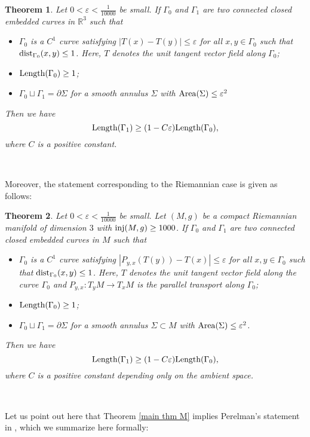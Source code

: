 \documentclass[a4paper, reqno]{amsart}
\newtheorem{theorem}{Theorem}[section]
\theoremstyle{definition}
\theoremstyle{remark}
\numberwithin{equation}{section}
\newcommand{\dist}{\textup{dist}}
\newcommand{\Len}{\textup{Length}}
\newcommand{\inj}{\textup{inj}}
\numberwithin{equation}{section}
\numberwithin{equation}{section}
\begin{document}
\begin{theorem}{\label{main thm}}
		Let $0<\varepsilon<\frac{1}{10000}$ be small. If $\Gamma_0$ and $\Gamma_1$ are two connected closed embedded curves in $\mathbb{R}^3$ such that
	\begin{itemize}
		\item[(i)] $\Gamma_0$ is a $C^1$ curve satisfying $|T(x) - T(y)| \leq\varepsilon$ for all $x, y\in\Gamma_0$ such that $\dist_{\Gamma_0}(x,y)\leq 1$. Here, $T$ denotes the unit tangent vector field along $\Gamma_0$;
		\item[(ii)] $\Len(\Gamma_0) \geq 1$;
		\item[(iii)] $\Gamma_0\sqcup \Gamma_1 = \partial\Sigma$ for a smooth annulus $\Sigma$ with $\textup{Area}(\Sigma)\leq \varepsilon^2$
	\end{itemize}
Then we have
\[\Len(\Gamma_1)\geq (1-C\varepsilon) \Len(\Gamma_0),\]
where $C$ is a positive constant.
\end{theorem}\

Moreover, the statement corresponding to the Riemannian case is given as follows:


\begin{theorem}{\label{main thm M}}
		Let $0<\varepsilon<\frac{1}{10000}$ be small. Let $(M,g)$ be a compact Riemannian manifold of dimension $3$ with $\inj(M,g)\geq 1000$. If $\Gamma_0$ and $\Gamma_1$ are two connected closed embedded curves in $M$ such that
	\begin{itemize}
		\item[(i)] $\Gamma_0$ is a $C^1$ curve satisfying $|P_{y,x}(T(y)) - T(x)| \leq\varepsilon$ for all $x, y\in\Gamma_0$ such that $\dist_{\Gamma_0}(x,y)\leq 1$. Here, $T$ denotes the unit tangent vector field along the curve $\Gamma_0$ and $P_{y,x}: T_yM \to T_xM$ is the parallel transport along $\Gamma_0$;
		\item[(ii)] $\Len(\Gamma_0)\geq 1$;
		\item[(iii)] $\Gamma_0\sqcup \Gamma_1 = \partial\Sigma$ for a smooth annulus $\Sigma\subset M$ with $\textup{Area}(\Sigma)\leq \varepsilon^2$.
	\end{itemize}
Then we have
\[\Len(\Gamma_1)\geq (1-C\varepsilon) \Len(\Gamma_0),\]
where $C$ is a positive constant depending only on the ambient space.
\end{theorem}\

Let us point out here that Theorem \ref{main thm M} implies Perelman's statement in \cite{PL3}, which we summarize here formally:
\end{document}
